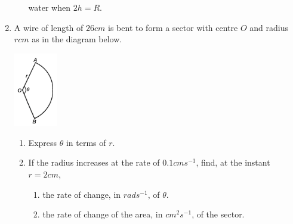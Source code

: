 \documentclass{report}
\begin{document}
\begin{multicols}{2}
\begin{enumerate}
\begin{enumerate}
                              water when $2h = R$.
                  \end{enumerate}
            \item A wire of length of $26\textit{cm}$ is bent to form a sector with centre $O$
                  and radius $r\textit{cm}$ as in the diagram below.
                  \begin{center}
                        \includegraphics[width=0.15\textwidth]{./images/k2q6.jpeg}
                  \end{center}
                  \begin{enumerate}
                        \item Express $\theta$ in terms of $r$.
                        \item If the radius increases at the rate of $0.1\textit{cm}\textit{s}^{-1}$, find,
                              at the instant $r = 2\textit{cm}$,
                              \begin{enumerate}
                                    \item the rate of change, in $\textit{rad}\textit{s}^{-1}$, of $\theta$.
                                    \item the rate of change of the area, in $\textit{cm}^2\textit{s}^{-1}$, of the
                                          sector.
                              \end{enumerate}
                  \end{enumerate}
      \end{enumerate}

\end{multicols}
\end{document}
